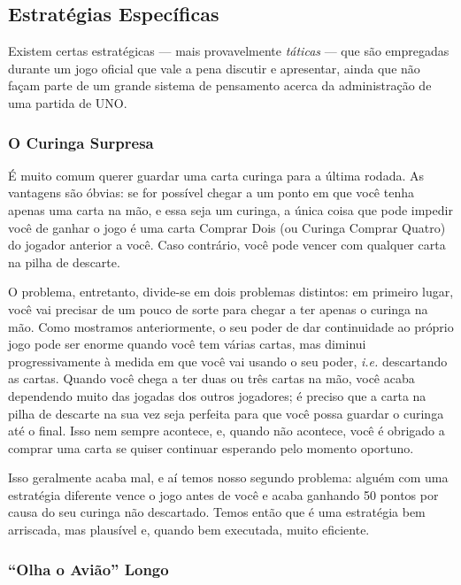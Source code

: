 \subsection{Estratégias Específicas}

Existem certas estratégicas --- mais provavelmente \textit{táticas} --- que são empregadas durante um jogo oficial que vale a pena discutir e apresentar, ainda que não façam parte de um grande sistema de pensamento acerca da administração de uma partida de UNO.

\subsubsection{O Curinga Surpresa}

\label{curingasurpresa}

É muito comum querer guardar uma carta curinga para a última rodada. As vantagens são óbvias: se for possível chegar a um ponto em que você tenha apenas uma carta na mão, e essa seja um curinga, a única coisa que pode impedir você de ganhar o jogo é uma carta Comprar Dois (ou Curinga Comprar Quatro) do jogador anterior a você. Caso contrário, você pode vencer com qualquer carta na pilha de descarte.

O problema, entretanto, divide-se em dois problemas distintos: em primeiro lugar, você vai precisar de um pouco de sorte para chegar a ter apenas o curinga na mão. Como mostramos anteriormente, o seu poder de dar continuidade ao próprio jogo pode ser enorme quando você tem várias cartas, mas diminui progressivamente à medida em que você vai usando o seu poder, \textit{i.e.} descartando as cartas. Quando você chega a ter duas ou três cartas na mão, você acaba dependendo muito das jogadas dos outros jogadores; é preciso que a carta na pilha de descarte na sua vez seja perfeita para que você possa guardar o curinga até o final. Isso nem sempre acontece, e, quando não acontece, você é obrigado a comprar uma carta se quiser continuar esperando pelo momento oportuno.

Isso geralmente acaba mal, e aí temos nosso segundo problema: alguém com uma estratégia diferente vence o jogo antes de você e acaba ganhando 50 pontos por causa do seu curinga não descartado. Temos então que é uma estratégia bem arriscada, mas plausível e, quando bem executada, muito eficiente.

\subsubsection{``Olha o Avião'' Longo}

